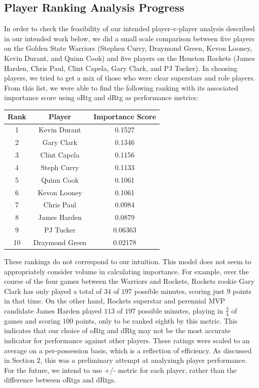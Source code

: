 \documentclass[12pt]{article}%
\begin{document}
\subsection{Player Ranking Analysis Progress}
\null\quad\quad In order to check the feasibility of our intended player-v-player analysis described in our intended work below, we did a small scale comparison between five players on the Golden State Warriors (Stephen Curry, Draymond Green, Kevon Looney, Kevin Durant, and Quinn Cook) and five players on the Houston Rockets (James Harden, Chris Paul, Clint Capela, Gary Clark, and PJ Tucker). In choosing players, we tried to get a mix of those who were clear superstars and role players. From this list, we were able to find the following ranking with its associated importance score using oRtg and dRtg as performance metrics:
\begin{center}
\begin{tabular}{|c|c c|}
\hline
\textbf{Rank} & \textbf{Player} & \textbf{Importance Score}\\\hline
1  & Kevin Durant &     0.1527\\
2  & Gary Clark   &  0.1346\\
3  & Clint Capela  &    0.1156\\
4  & Steph Curry   &  0.1133\\
5  & Quinn Cook     & 0.1061\\
6  & Kevon Looney   &   0.1061\\
7  & Chris Paul     & 0.0984\\
8  & James Harden   &   0.0879\\
9  & PJ Tucker     &0.06363\\
10  &  Draymond Green&    0.02178\\
\hline
\end{tabular}
\end{center}
\null\quad\quad These rankings do not correspond to our intuition. This model does not seem to appropriately consider volume in calculating importance. For example, over the course of the four games between the Warriors and Rockets, Rockets rookie Gary Clark has only played a total of $34$ of $197$ possible minutes, scoring just $9$ points in that time. On the other hand, Rockets superstar and perennial MVP candidate James Harden played $113$ of $197$ possible minutes, playing in $\frac34$ of games and scoring $100$ points, only to be ranked eighth by this metric. This indicates that our choice of oRtg and dRtg may not be the most accurate indicator for performance against other players. These ratings were scaled to an average on a per-possession basis, which is a reflection of efficiency. As discussed in Section 2, this was a preliminary attempt at analyzingh player performance. For the future, we intend to use +/- metric for each player, rather than the difference between oRtgs and dRtgs. 
\end{document}
